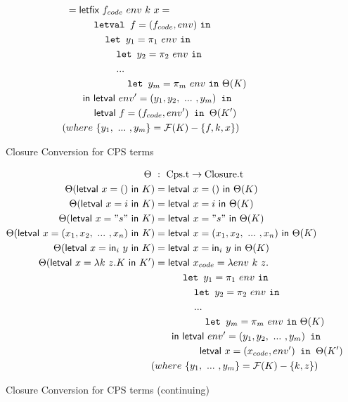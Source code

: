 \documentclass{article}
\theoremstyle{definition}
\theoremstyle{remark}
\numberwithin{equation}{section}
\begin{document}
\begin{figure}[!ht]
\begin{align*}
    &=\textsf{letfix }f_{code}\ env\ k\ x=\\
    &\kern1cm   \texttt{letval }f=(f_{code}, env)\ \texttt{in}\\
    &\kern1.4cm   \texttt{let }y_1=\pi _1\ env\ \texttt{in}\\
    &\kern1.8cm   \texttt{let }y_2=\pi _2\ env\ \texttt{in}\\
    &\kern1.8cm   ...\\
    &\kern2.2cm   \texttt{let }y_m=\pi _m\ env\ \texttt{in}\ \Theta(K)\\
    &\kern0.6cm\textsf{in letval }env'=(y_1, y_2, \ ...\ ,y_m)\texttt{ in}\\
    &\kern1cm\textsf{letval }f=(f_{code}, env')\texttt{ in }\Theta(K')\\  %
    (&where\ \{y_1,\ ...\ ,y_m\}=\mathcal{F}(K)-\{f,k,x\})
\end{align*}
  \caption{Closure Conversion for CPS terms}
  \label{fig-sub}
\end{figure}

\begin{figure}[!ht]
  \centering
\begin{align*}
\Theta\ &:\ \textrm{Cps.t} \to \textrm{Closure.t}\\     %
\Theta(\textsf{letval }x=()\textsf{ in }K)
    &=\textsf{letval }x=()\textsf{ in }\Theta(K)\\   %
\Theta(\textsf{letval }x=i\textsf{ in }K)
    &=\textsf{letval }x=i\textsf{ in }\Theta(K)\\   %
\Theta(\textsf{letval }x="s"\textsf{ in }K)
    &=\textsf{letval }x="s"\textsf{ in }\Theta(K)\\   %
\Theta(\textsf{letval }x=(x_1, x_2,\ ...\ , x_n)\textsf{ in }K)
    &=\textsf{letval }x=(x_1, x_2,\ ...\ , x_n)\textsf{ in }
    \Theta(K)\\ %
\Theta(\textsf{letval }x=\textsf{in}_i\ y\textsf{ in }K)
    &=\textsf{letval }x=\textsf{in}_i\ y\textsf{ in }\Theta(K)\\%
\Theta(\textsf{letval }x=\lambda k\ z.K\textsf{ in }K')
    &=\textsf{letval }x_{code}=\lambda env\ k\ z.\\
    &\kern1cm   \texttt{let }y_1=\pi _1\ env\ \texttt{in}\\
    &\kern1.4cm   \texttt{let }y_2=\pi _2\ env\ \texttt{in}\\
    &\kern1.4cm   ...\\
    &\kern1.8cm   \texttt{let }y_m=\pi _m\ env\ \texttt{in}\ \Theta(K)\\
    &\kern0.6cm\textsf{in letval }env'=(y_1, y_2, \ ...\ ,y_m)\texttt{ in}\\
    &\kern1.6cm\textsf{letval }x=(x_{code}, env')\texttt{ in }\Theta(K')\\
    (&where\ \{y_1,\ ...\ ,y_m\}=\mathcal{F}(K)-\{k, z\})%
\end{align*}
  \caption{Closure Conversion for CPS terms (continuing)}
  \label{fig-sub}
\end{figure}
\end{document}
